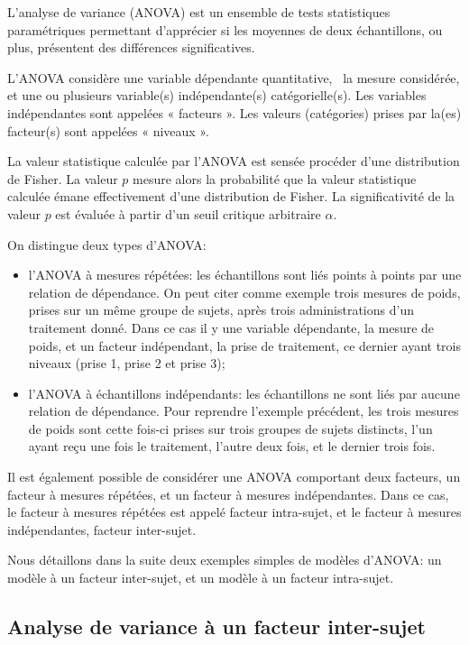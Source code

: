 L'analyse de variance (ANOVA) est un ensemble de tests statistiques paramétriques permettant d'apprécier si les moyennes de deux échantillons, ou plus, présentent des différences significatives.

L'ANOVA considère une variable dépendante quantitative, \ie~la mesure considérée, et une ou plusieurs variable(s) indépendante(s) catégorielle(s). Les variables indépendantes sont appelées « facteurs ». Les valeurs (catégories) prises par la(es) facteur(s) sont appelées « niveaux ».

La valeur statistique calculée par l'ANOVA est sensée procéder d'une distribution de Fisher. La valeur $p$ mesure alors la probabilité que la valeur statistique calculée émane effectivement d'une distribution de Fisher. La significativité de la valeur $p$ est évaluée à partir d'un seuil critique arbitraire $\alpha$.

On distingue deux types d'ANOVA:

\begin{itemize}
\item l'ANOVA à mesures répétées: les échantillons sont liés points à points par une relation de dépendance. On peut citer comme exemple trois mesures de poids, prises sur un même groupe de sujets, après trois administrations d'un traitement donné. Dans ce cas il y une variable dépendante, la mesure de poids, et un facteur indépendant, la prise de traitement, ce dernier ayant trois niveaux (prise 1, prise 2 et prise 3);  
\item l'ANOVA à échantillons indépendants: les échantillons ne sont liés par aucune relation de dépendance. Pour reprendre l'exemple précédent, les trois mesures de poids sont cette fois-ci prises sur trois groupes de sujets distincts, l'un ayant reçu une fois le traitement, l'autre deux fois, et le dernier trois fois.
\end{itemize}

Il est également possible de considérer une ANOVA comportant deux facteurs, un facteur à mesures répétées, et un facteur à mesures indépendantes. Dans ce cas, le facteur à mesures répétées est appelé facteur intra-sujet, et le facteur à mesures indépendantes, facteur inter-sujet. 

Nous détaillons dans la suite deux exemples simples de modèles d'ANOVA: un modèle à un facteur inter-sujet, et un modèle à un facteur intra-sujet.

\subsection*{Analyse de variance à un facteur inter-sujet}

